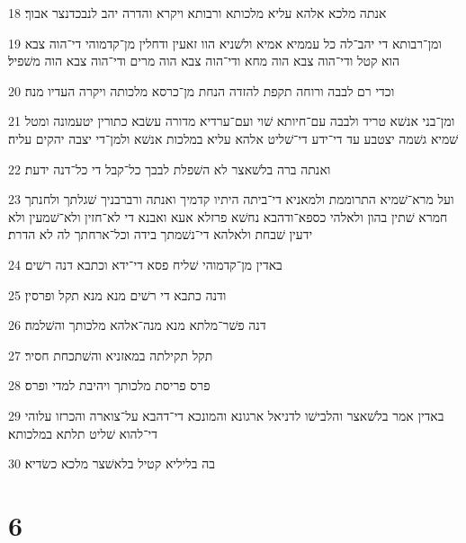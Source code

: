 \par 18 אנתה מלכא אלהא עליא מלכותא ורבותא ויקרא והדרה יהב לנבכדנצר אבוך׃
\par 19 ומן־רבותא די יהב־לה כל עממיא אמיא ולשׁניא הוו זאעין ודחלין מן־קדמוהי די־הוה צבא הוא קטל ודי־הוה צבא הוה מחא ודי־הוה צבא הוה מרים ודי־הוה צבא הוה משׁפיל׃
\par 20 וכדי רם לבבה ורוחה תקפת להזדה הנחת מן־כרסא מלכותה ויקרה העדיו מנה׃
\par 21 ומן־בני אנשׁא טריד ולבבה עם־חיותא שׁוי ועם־ערדיא מדורה עשׂבא כתורין יטעמונה ומטל שׁמיא גשׁמה יצטבע עד די־ידע די־שׁליט אלהא עליא במלכות אנשׁא ולמן־די יצבה יהקים עליה׃
\par 22 ואנתה ברה בלשׁאצר לא השׁפלת לבבך כל־קבל די כל־דנה ידעת׃
\par 23 ועל מרא־שׁמיא התרוממת ולמאניא די־ביתה היתיו קדמיך ואנתה ורברבניך שׁגלתך ולחנתך חמרא שׁתין בהון ולאלהי כספא־ודהבא נחשׁא פרזלא אעא ואבנא די לא־חזין ולא־שׁמעין ולא ידעין שׁבחת ולאלהא די־נשׁמתך בידה וכל־ארחתך לה לא הדרת׃
\par 24 באדין מן־קדמוהי שׁליח פסא די־ידא וכתבא דנה רשׁים׃
\par 25 ודנה כתבא די רשׁים מנא מנא תקל ופרסין׃
\par 26 דנה פשׁר־מלתא מנא מנה־אלהא מלכותך והשׁלמה׃
\par 27 תקל תקילתה במאזניא והשׁתכחת חסיר׃
\par 28 פרס פריסת מלכותך ויהיבת למדי ופרס׃
\par 29 באדין אמר בלשׁאצר והלבישׁו לדניאל ארגונא והמונכא די־דהבא על־צוארה והכרזו עלוהי די־להוא שׁליט תלתא במלכותא׃
\par 30 בה בליליא קטיל בלאשׁצר מלכא כשׂדיא׃

\chapter{6}

